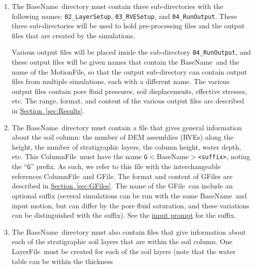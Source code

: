 \documentclass[letterpaper,11pt]{article}
\newcommand{\BaseName}{\textsf{BaseName}}
\newcommand{\ColumnFile}{\textsf{ColumnFile}}
\newcommand{\LayerFile}{\textsf{LayerFile}}
\newcommand{\GFile}{\textsf{GFile}}
\newcommand{\MotionFile}{\textsf{MotionFile}}
\begin{document}
    \begin{enumerate}
      \item\label{item:BaseNameDirectory}
        The \BaseName\ directory must contain three sub-directories
        with the following names:
        \texttt{02\_LayerSetup}, \texttt{03\_RVESetup},
        and \texttt{04\_RunOutput}.
        These three sub-directories will be used to hold
        pre-processing files and the output files that are
        created by the simulations.
        \par
        \rule{0ex}{3ex}Various output files will be placed inside the
        sub-directory \texttt{04\_RunOutput}, and these
        output files will be given names that contain
        the \BaseName\ and the name of the \MotionFile,
        so that the output sub-directory can contain
        output files
        from multiple simulations, each with a different
        name.
        The various output files contain pore fluid pressures,
        soil displacements, effective stresses, etc.
        The range, format, and content of the various output files
        are described in
        \hyperref[sec:Results]{Section~\ref*{sec:Results}}.
      \item\label{item:BaseName2}
        The \BaseName\ directory must contain a file that gives
        general information about the soil column:
        the number of DEM assemblies (RVEs) along the height,
        the number of stratigraphic layers, the column height,
        water depth, etc.
        This \ColumnFile\ must have the name
        \texttt{G}$<$\BaseName$>$\texttt{<suffix>}, noting the
        ``\texttt{G}'' prefix.
        As such, we refer to this file with the interchangeable
        references \ColumnFile\ and \GFile.
        The format and content of \GFile s are described
        in \hyperref[sec:GFiles]{Section~\ref*{sec:GFiles}}.
        The name of the \GFile\ can include an optional suffix
        (several simulations can be run with the same
        \BaseName\ and input motion, but can differ by the
        pore fluid saturation, and these variations can be
        distinguished with the suffix).
        See the \hyperref[par:input]{input prompt} for
        the suffix.
      \item\label{sec:Lfiles0}
        The \BaseName\ directory must also contain files that
        give information about each of the stratigraphic soil
        layers that are within the soil column.
        One \LayerFile\ must be created for each of the soil
        layers
        (note that the water table can be within the thickness

\end{enumerate}
\end{document}
